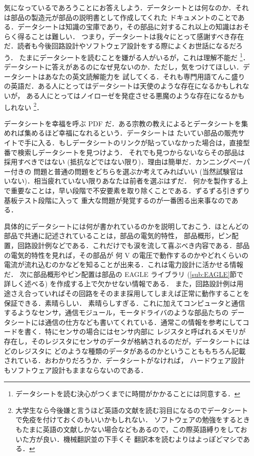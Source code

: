 \documentclass[dvipdfmx]{jsbook}
\begin{document}
  気になっているであろうことにお答えしよう．データシートとは何なのか．それは部品の製造元が部品の説明書として作成してくれた
  ドキュメントのことである．データシートは知識の宝庫であり，その部品に対するこれ以上の知識はおそらく得ることは難しい．
  つまり，データシートは我々にとって感謝すべき存在だ．読者も今後回路設計やソフトウェア設計をする際によくお世話になるだろう．
  たまにデータシートを読むことを嫌がる人がいるが，これは理解不能だ
  \footnote{データシートを読む決心がつくまでに時間がかかることには同意する．}．
  データシートに答えがあるのになぜ見ないのか．ただし，気をつけてほしい．データシートはあなたの英文読解能力を
  試してくる．それも専門用語てんこ盛りの英語だ．ある人にとってはデータシートは天使のような存在になるかもしれないが，
  ある人にとってはノイローゼを発症させる悪魔のような存在になるかもしれない
  \footnote{大学生なら今後嫌と言うほど英語の文献を読む羽目になるのでデータシートで免疫を付けておくのもいいかもしれない．
  ソフトウェアの勉強をするときもたまに英語の文献しかない場合などもあるので，この際英語縛りをしておいた方が良い．機械翻訳並の下手くそ
  翻訳本を読むよりはよっぽどマシである．}．

  データシートを幸福を呼ぶ PDF だ．ある宗教の教えによるとデータシートを集めれば集めるほど幸福になれるという．データシートは
  たいてい部品の販売サイトで手に入る．もしデータシートのリンクが貼っていなかった場合は，直接型番で検索しデータシートを見つけよう．
  それでも見つからないならその部品は採用すべきではない (抵抗などではない限り)．理由は簡単だ．カンニングペーパー付きの
  問題と普通の問題をどちらを選ぶか考えてみればいい (当然試験官はいない)．相当疲れていない限りあなたは前者を選ぶはずだ．
  何かを製作する上で重要なことは，早い段階で不安要素を取り除くことである．ずるずる引きずり基板テスト段階に入って
  重大な問題が発覚するのが一番困る出来事なのである．

  具体的にデータシートには何が書かれているのかを説明しておこう．ほとんどの部品で共通に記述されていることは，部品の電気的特性，
  部品概形，ピン配置，回路設計例などである．これだけでも涙を流して喜ぶべき内容である．部品の電気的特性を見れば，その部品が
  何 V の電圧で動作するのかやどれくらいの電流が流れ込むのかなどを知ることが出来る．これは電力設計に活かせる情報だ．
  次に部品概形やピン配置は部品の EAGLE ライブラリ (\ref{sub:EAGLE}節で詳しく述べる) を作成する上で欠かせない情報である．
  また，回路設計例は用途さえ合っていればその回路をそのまま採用してしまえば正常に動作することを保証できる．素晴らしい．
  素晴らしすぎる．これに加えてコンピュータと通信するようなセンサ，通信モジュール，モータドライバのような部品たちの
  データシートには通信の仕方なども書いてくれている．通常この情報を参考にしてコードを書く．特にセンサの場合にはセンサ内部に
  レジスタと呼ばれるメモリが存在し，そのレジスタにセンサのデータが格納されるのだが，データシートにはどのレジスタに
  どのような種類のデータがあるのかということももちろん記載されている．おわかりだろうか．データシートがなければ，
  ハードウェア設計もソフトウェア設計もままならないのである．
\end{document}
